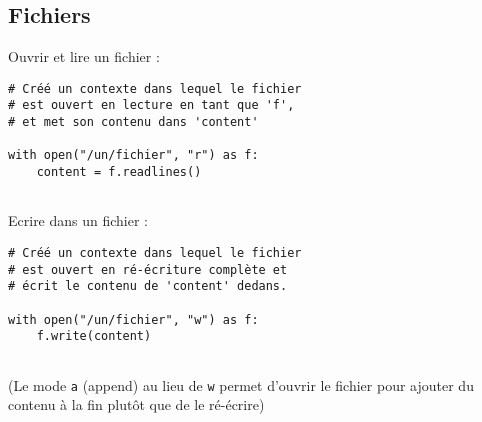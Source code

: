\documentclass[]{article}
\begin{document}
\hypertarget{fichiers}{%
\subsection{Fichiers}\label{fichiers}}

Ouvrir et lire un fichier :

\begin{verbatim}
# Créé un contexte dans lequel le fichier
# est ouvert en lecture en tant que 'f', 
# et met son contenu dans 'content'

with open("/un/fichier", "r") as f:  
    content = f.readlines()          
                                     
\end{verbatim}

Ecrire dans un fichier :

\begin{verbatim}
# Créé un contexte dans lequel le fichier
# est ouvert en ré-écriture complète et
# écrit le contenu de 'content' dedans.

with open("/un/fichier", "w") as f:  
    f.write(content)                 
                                     
\end{verbatim}

(Le mode \texttt{\textquotesingle{}a\textquotesingle{}} (append) au lieu
de \texttt{\textquotesingle{}w\textquotesingle{}} permet d'ouvrir le
fichier pour ajouter du contenu à la fin plutôt que de le ré-écrire)
\end{document}
